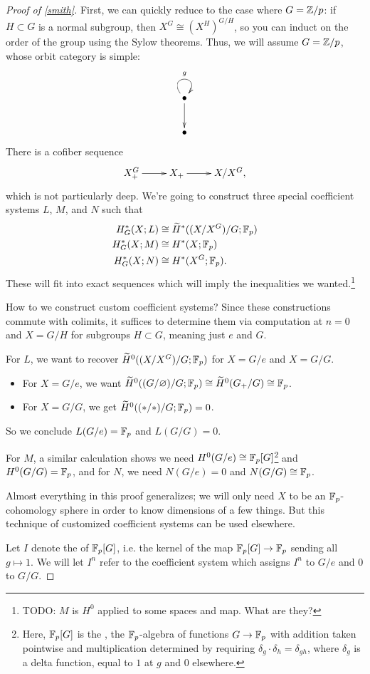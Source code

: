 \begin{proof}[Proof of \cref{smith}]
First, we can quickly reduce to the case where $G = \mathbb Z/p$: if $H\subset G$ is a normal subgroup, then $X^G\cong
(X^H)^{G/H}$, so you can induct on the order of the group using the Sylow theorems. Thus, we will assume $G =
\mathbb Z/p$, whose orbit category is simple:
\[\xymatrix{
	\bullet\ar@(ul, ur)^g\ar[d]\\
	\bullet
}\]
There is a cofiber sequence
\[\xymatrix{
	X_+^G\ar[r] & X_+\ar[r] & X/X^G,
}\]
which is not particularly deep. We're going to construct three special coefficient systems $L$, $M$, and $N$ such
that
\begin{align*}
	H_G^*(X;L) &\cong \widetilde H^*((X/X^G)/G; \mathbb F_p)\\
	H_G^*(X;M) &\cong H^*(X;\mathbb F_p)\\
	H_G^*(X;N) &\cong H^*(X^G;\mathbb F_p).
\end{align*}
These will fit into exact sequences which will imply the inequalities we wanted.\footnote{{\color{red}TODO}: $M$ is
$H^0$ applied to some spaces and map. What are they?}

How to we construct custom coefficient systems? Since these constructions commute with colimits, it suffices to
determine them via computation at $n = 0$ and $X = G/H$ for subgroups $H\subset G$, meaning just $e$ and $G$.

For $L$, we want to recover $\widetilde H^0((X/X^G)/G;\mathbb F_p)$ for $X = G/e$ and $X = G/G$.
\begin{itemize}
	\item For $X = G/e$, we want $\widetilde H^0((G/\varnothing)/G;\mathbb F_p)\cong \widetilde H^0(G_+/G)\cong\mathbb F_p$.
	\item For $X = G/G$, we get $\widetilde H^0((*/*)/G;\mathbb F_p) = 0$.
\end{itemize}
So we conclude $L(G/e) = \mathbb F_p$ and $L(G/G) = 0$.

For $M$, a similar calculation shows we need $H^0(G/e)\cong\mathbb F_p[G]$\footnote{Here, $\mathbb F_p[G]$ is the , the $\mathbb F_p$-algebra of functions $G\to\mathbb F_p$ with addition taken pointwise and multiplication determined by
requiring $\delta_g\cdot\delta_h = \delta_{gh}$, where $\delta_g$ is a delta function, equal to $1$ at $g$ and $0$
elsewhere.} and $H^0(G/G) = \mathbb F_p$, and for $N$, we need $N(G/e) = 0$ and $N(G/G)\cong\mathbb F_p$.
\begin{rem}
Almost everything in this proof generalizes; we will only need $X$ to be an $\mathbb F_p$-cohomology sphere in order to
know dimensions of a few things. But this technique of customized coefficient systems can be used elsewhere.
\end{rem}
Let $I$ denote the  of $\mathbb F_p[G]$, i.e. the kernel of the map $\mathbb F_p[G]\to\mathbb F_p$ sending all
$g\mapsto 1$. We will let $I^n$ refer to the coefficient system which assigns $I^n$ to $G/e$ and $0$ to $G/G$.


\end{proof}

